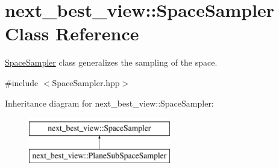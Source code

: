 \hypertarget{classnext__best__view_1_1SpaceSampler}{\section{next\-\_\-best\-\_\-view\-:\-:\-Space\-Sampler \-Class \-Reference}
\label{classnext__best__view_1_1SpaceSampler}
}


\hyperlink{classnext__best__view_1_1SpaceSampler}{\-Space\-Sampler} class generalizes the sampling of the space.  




{\ttfamily \#include $<$\-Space\-Sampler.\-hpp$>$}

\-Inheritance diagram for next\-\_\-best\-\_\-view\-:\-:\-Space\-Sampler\-:\begin{figure}[H]
\begin{center}
\leavevmode
\includegraphics[height=2.000000cm]{classnext__best__view_1_1SpaceSampler}
\end{center}
\end{figure}
